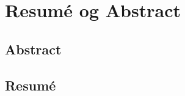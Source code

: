 \chapter{Resumé og Abstract}
\label{chap:resume}


\section*{Abstract}






\section*{Resumé}





